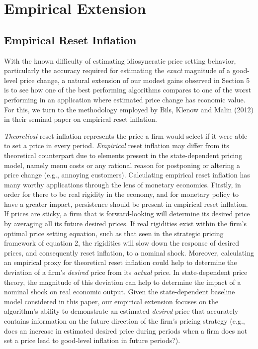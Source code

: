 \documentclass[11pt]{article}
\begin{document}
\section{Empirical Extension}
\subsection{Empirical Reset Inflation}

With the known difficulty of estimating idiosyncratic price setting behavior, particularly the accuracy required for estimating the \textit{exact} magnitude of a good-level price change, a natural extension of our modest gains observed in Section 5 is to see how one of the best performing algorithms compares to one of the worst performing in an application where estimated price change has economic value. For this, we turn to the methodology employed by Bils, Klenow and Malin (2012) in their seminal paper on empirical reset inflation. 

\textit{Theoretical} reset inflation represents the price a firm would select if it were able to set a price in every period. \textit{Empirical} reset inflation may differ from its theoretical counterpart due to elements present in the state-dependent pricing model, namely menu costs or any rational reason for postponing or altering a price change (e.g., annoying customers). Calculating empirical reset inflation has many worthy applications through the lens of monetary economics. Firstly, in order for there to be real rigidity in the economy, and for monetary policy to have a greater impact, persistence should be present in empirical reset inflation. If prices are sticky, a firm that is forward-looking will determine its desired price by averaging all its future desired prices. If real rigidities exist within the firm's optimal price setting equation, such as that seen in the strategic pricing framework of equation 2, the rigidities will slow down the response of desired prices, and consequently reset inflation, to a nominal shock. Moreover, calculating an empirical proxy for theoretical reset inflation could help to determine the deviation of a firm's \textit{desired} price from its \textit{actual} price. In state-dependent price theory, the magnitude of this deviation can help to determine the impact of a nominal shock on real economic output. Given the state-dependent baseline model considered in this paper, our empirical extension focuses on the algorithm's ability to demonstrate an estimated \textit{desired} price that accurately contains information on the future direction of the firm's pricing strategy (e.g., does an increase in estimated desired price during periods when a firm does not set a price lead to good-level inflation in future periods?).
\end{document}
